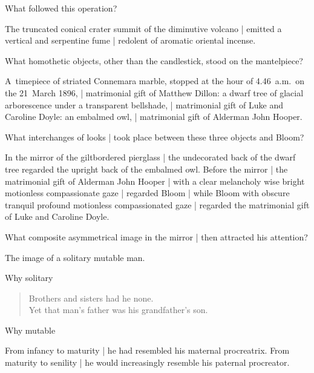 
What followed this operation?

\Science
The truncated conical crater summit of the diminutive volcano |
emitted a vertical and serpentine fume |
redolent of aromatic oriental incense.


What homothetic objects,
other than the candlestick,
stood on the mantelpiece?

\Household
A~timepiece of striated Connemara marble,
stopped at the hour of 4.46~a.m.\ on the 21~March 1896, |
matrimonial gift of Matthew Dillon:
a dwarf tree of glacial arborescence under a transparent bellshade, |
matrimonial gift of Luke and Caroline Doyle:
an embalmed owl, |
matrimonial gift of Alderman John Hooper.



What interchanges of looks |
took place between these three objects and
Bloom?%

\Household
In the mirror of the giltbordered pierglass |
the undecorated back of the dwarf tree
regarded the upright back of the embalmed owl.
Before the mirror |
the matrimonial gift of Alderman John Hooper |
with a clear melancholy wise bright
motionless compassionate gaze |
regarded Bloom |
while Bloom with obscure tranquil profound motionless compassionated gaze |
regarded the matrimonial gift of Luke and Caroline Doyle.



What composite asymmetrical image in the mirror |
then attracted his attention?

\Philosophy
The image of a solitary
mutable
man.


Why solitary

\Poetry

\begin{verse}
    Brothers and sisters had he none.\\
    Yet that man's father was his grandfather's son.
\end{verse}


Why mutable

\Philosophy
From infancy to maturity |
he had resembled his maternal procreatrix.
From maturity to senility |
he would increasingly resemble his paternal procreator.



